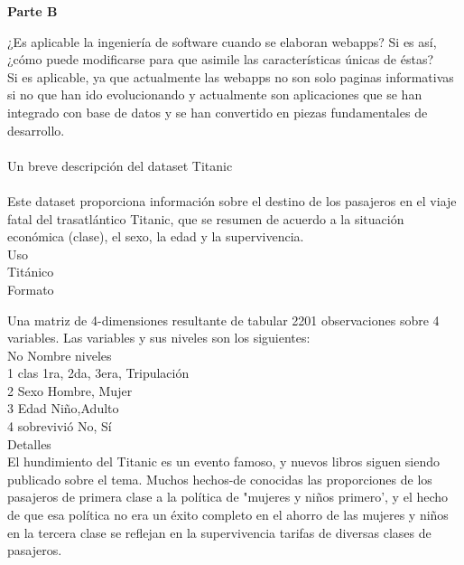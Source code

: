 \documentclass[a4paper,openright,12pt]{report}
\begin{document}
{
\renewcommand{\footrulewidth}{0pt}

\newpage

\begin{center}\huge{}\textbf{Parte B}\end{center}
¿Es aplicable la ingeniería de software cuando se elaboran webapps? Si es así, ¿cómo puede modificarse para que asimile las características únicas de éstas?\\

Si es aplicable, ya que actualmente las webapps no son solo paginas informativas si no que han ido evolucionando y actualmente son aplicaciones que se han integrado con base de datos y se han convertido en piezas fundamentales de desarrollo. \\ \\

Un breve descripción del dataset Titanic\\ \\
Este dataset proporciona información sobre el destino de los pasajeros en el viaje fatal del trasatlántico Titanic, que se resumen de acuerdo a la situación económica (clase), el sexo, la edad y la supervivencia.\\

Uso\\
Titánico\\
Formato

Una matriz de 4-dimensiones resultante de tabular 2201 observaciones sobre 4 variables. Las variables y sus niveles son los siguientes:\\

No Nombre niveles \\
1  clas   1ra, 2da, 3era, Tripulación\\
2 Sexo     Hombre, Mujer\\
3 Edad     Niño,Adulto\\
4 sobrevivió No, Sí\\

Detalles\\

El hundimiento del Titanic es un evento famoso, y nuevos libros siguen siendo publicado sobre el tema. Muchos hechos-de conocidas las proporciones de los pasajeros de primera clase a la política de "mujeres y niños primero', y el hecho de que esa política no era un éxito completo en el ahorro de las mujeres y niños en la tercera clase se reflejan en la supervivencia tarifas de diversas clases de pasajeros.\\

}
\end{document}
